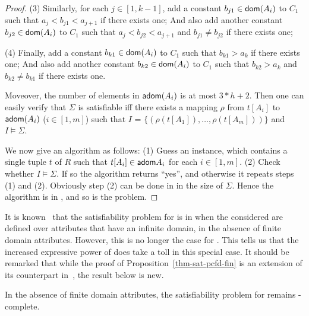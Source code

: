 \begin{proof}
\item[(3)] Similarly, for each $j\in[1, k - 1]$, add a constant $b_{j1}\in\protect\mathsf{dom}(A_i)$ to $C_1$
such that $a_j < b_{j1} < a_{j+1}$ if there exists
one; And also add another constant $b_{j2}\in\protect\mathsf{dom}(A_i)$ to $C_1$ such
that $a_j < b_{j2} < a_{j+1}$ and $b_{j1}\ne b_{j2}$ if
there exists one;

\item[(4)] Finally, add a constant $b_{k1}\in\protect\mathsf{dom}(A_i)$ to $C_1$ such that $b_{k1} > a_k$ if there exists one;
And also add another constant $b_{k2}\in\protect\mathsf{dom}(A_i)$ to $C_1$ such that
$b_{k2} > a_k$ and $b_{k2} \ne b_{k1}$ if there exists one. 
\ei

\noindent Moveover, the number of elements in ${\mathsf{adom}}(A_i)$ is at
most $3*h + 2$. Then one can easily verify that $\Sigma$ is
satisfiable iff there exists a mapping $\rho$ from $t[A_i]$ to
${\mathsf{adom}}(A_i)$ ($i\in [1, m]$) such that $I$ = $\{(\rho(t[A_1]),
\ldots, \rho(t[A_m]))\}$ and $I \models \Sigma$.


We now give an \NP algorithm as follows: (1) Guess an
instance, which contains a single tuple $t$ of $R$ such that
$t[A_i]\in{\ensuremath {\mathsf{adom}}}{A_i}$ for each $i \in [1, m]$. (2) Check whether $I
\models \Sigma$. If so the algorithm returns ``yes'', and otherwise
it repeats steps (1) and (2). Obviously step (2) can be done in
\PTIME in the size of $\Sigma$. Hence the algorithm is in \NP, and
so is the problem. 
\end{proof}


It is known~\cite{CFDs} that the satisfiability problem for \CFDs is
in \PTIME when the \CFDs considered are defined over attributes that
have an infinite domain, \ie in the absence of finite domain
attributes. However, this is no longer the case for \pCFDs. This
tells us that the increased expressive power of \pCFDs does take a
toll in this special case. It should be remarked that while the
proof of Proposition~\ref{thm-sat-pcfd-fin} is an extension of its
counterpart in~\cite{CFDs}, the result below is new.


\begin{theorem}
\label{thm-sat-pcfd-infin} In the absence of finite domain
attributes, the satisfiability problem for \pCFDs remains
\NP-complete.
\end{theorem}

